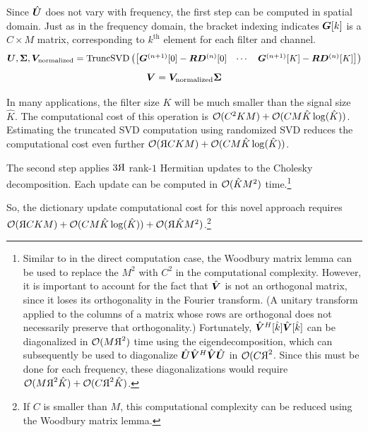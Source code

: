 Since $\hat{\bm{U}}$ does not vary with frequency, the first step can be computed in spatial domain. Just as in the frequency domain, the bracket indexing indicates $\bm{G}[k]$ is a $C \times M$ matrix, corresponding to $k^{\text{th}}$ element for each filter and channel.
\begin{equation}
\bm{U},\bm{\Sigma},\bm{V}_{\text{normalized}} = \operatorname{TruncSVD}\left(\begin{bmatrix}\bm{G}^{(n + 1)}[0] - \bm{R}\bm{D}^{(n)}[0] & \cdots & \bm{G}^{(n + 1)}[K] - \bm{R}\bm{D}^{(n)}[K]    \end{bmatrix}\right)
\end{equation}
\begin{equation}
\bm{V} = \bm{V}_{\text{normalized}}\bm{\Sigma}
\end{equation}

In many applications, the filter size $K$ will be much smaller than the signal size $\hat{K}$.  The computational cost of this operation is $\mathcal{O}(C^2KM) + \mathcal{O}(CM\hat{K}\operatorname{log}(\hat{K}))$. Estimating the truncated SVD computation using randomized SVD reduces the computational cost even further $\bigO(\reflectbox{R}CKM) + \bigO(CM\hat{K}\operatorname{log}(\hat{K}))$.

The second step applies $3\reflectbox{R}$ rank-$1$ Hermitian updates to the Cholesky decomposition. Each update can be computed in $\mathcal{O}(\hat{K}M^2)$ time.\footnote{Similar to in the direct computation case, the Woodbury matrix lemma can be used to replace the $M^2$ with $C^2$ in the computational complexity. However, it is important to account for the fact that $\hat{\bm{V}}$ is not an orthogonal matrix, since it loses its orthogonality in the Fourier transform. (A unitary transform applied to the columns of a matrix whose rows are orthogonal does not necessarily preserve that orthogonality.) Fortunately, $\hat{\bm{V}}^H[\hat{k}]\hat{\bm{V}}[\hat{k}]$ can be diagonalized in $\bigO(M\reflectbox{R}^2)$ time using the eigendecomposition, which can subsequently be used to diagonalize $\hat{\bm{U}}\hat{\bm{V}}^H\hat{\bm{V}}\hat{\bm{U}}$ in $\bigO(C\reflectbox{R}^2$. Since this must be done for each frequency, these diagonalizations would require $\bigO(M\reflectbox{R}^2\hat{K}) + \bigO(C\reflectbox{R}^2\hat{K})$.}  

So, the dictionary update computational cost for this novel approach requires $\bigO(\reflectbox{R}CKM) + \bigO(CM\hat{K}\operatorname{log}(\hat{K})) + \bigO(\reflectbox{R}\hat{K}M^2)$.\footnote{If $C$ is smaller than $M$, this computational complexity can be reduced using the Woodbury matrix lemma.}

